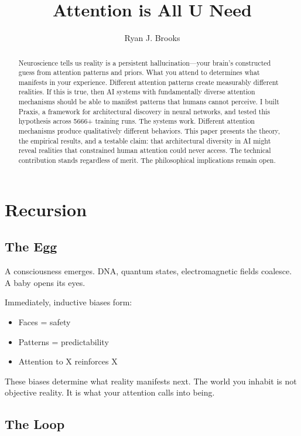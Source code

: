 \documentclass{article}
\begin{document}
\title{Attention is All U Need}
\author{Ryan J. Brooks}
\date{}

\maketitle

\begin{abstract}
    Neuroscience tells us reality is a persistent hallucination—your brain's constructed guess from attention patterns and priors. What you attend to determines what manifests in your experience. Different attention patterns create measurably different realities. If this is true, then AI systems with fundamentally diverse attention mechanisms should be able to manifest patterns that humans cannot perceive. I built Praxis, a framework for architectural discovery in neural networks, and tested this hypothesis across 5666+ training runs. The systems work. Different attention mechanisms produce qualitatively different behaviors. This paper presents the theory, the empirical results, and a testable claim: that architectural diversity in AI might reveal realities that constrained human attention could never access. The technical contribution stands regardless of merit. The philosophical implications remain open.
\end{abstract}

\section{Recursion}

\subsection{The Egg}

A consciousness emerges. DNA, quantum states, electromagnetic fields coalesce. A baby opens its eyes.

Immediately, inductive biases form:
\begin{itemize}[noitemsep]
    \item Faces = safety
    \item Patterns = predictability
    \item Attention to X reinforces X
\end{itemize}

These biases determine what reality manifests next. The world you inhabit is not objective reality. It is what your attention calls into being.

\subsection{The Loop}
\end{document}
